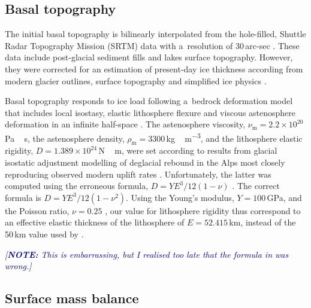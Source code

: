 \documentclass[tc, manuscript]{copernicus}
\newcommand{\note}[1]{\textcolor{darkblue}{\emph{[\textbf{NOTE:} #1]}}}
\begin{document}
\subsection{Basal topography}
\label{sec:bedrock}

    The initial basal topography is bilinearly interpolated from the
    hole-filled, Shuttle Radar Topography Mission (SRTM) data with a~resolution
    of 30\,arc-sec \citep{Jarvis.etal.2008}. These data include post-glacial
    sediment fills and lakes surface topography. However, they were corrected
    for an estimation of present-day ice thickness according from modern
    glacier outlines, surface topography and simplified ice physics
    \citep{Huss.Farinotti.2012}.

    Basal topography responds to ice load following a~bedrock deformation model
    that includes local isostasy, elastic lithosphere flexure and viscous
    astenosphere deformation in an infinite half-space
    \citep{Lingle.Clark.1985,Bueler.etal.2007}. The astenosphere viscosity,
    $\nu_{\mathrm{m}}=2.2\times10^{20}$\,\unit{Pa\,s}, the astenosphere
    density, $\rho_{\mathrm{m}}=3300$\,\unit{kg\,m^{-3}}, and the lithosphere
    elastic rigidity, $D=1.389 \times 10^{24}$\,\unit{N\,m}, were set according to
    results from glacial isostatic adjustment modelling of deglacial rebound in
    the Alps most closely reproducing observed modern uplift rates
    \citep[Supplementary Fig.~7]{Mey.etal.2016}. Unfortunately, the latter was
    computed using the erroneous formula, ${D=YE^3/12(1-\nu)}$
    \citep{Mey.etal.2016}. The correct formula is ${D=YE^3/12(1-\nu^2)}$.
    Using the Young's modulus, $Y=100$\,GPa, and the Poisson ratio, $\nu=0.25$
    \citep{Mey.etal.2016}, our value for lithosphere rigidity thus correspond
    to an effective elastic thickness of the lithosphere of $E=52.415$\,km,
    instead of the 50\,km value used by \citet{Mey.etal.2016}.

    \note{This is embarrassing, but I realised too late that the formula in
          \citet{Mey.etal.2016} was wrong.}


\subsection{Surface mass balance}
\label{sec:surface}
\end{document}
